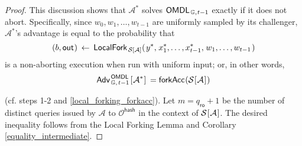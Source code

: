 \documentclass[10pt, psamsfonts, reqno]{amsart}
\theoremstyle{definition}
\theoremstyle{remark}
\numberwithin{equation}{section}
\begin{document}
\begin{proof}
This discussion shows that $\mathcal{A}^*$ solves
$\mathsf{OMDL}
	_{\hspace{1pt}\mathbb{G},\hspace{0.5pt} t-1}$
exactly if it does not abort.
Specifically, since $w_0, w_1, \dots, w_{t-1}$
are uniformly sampled by its challenger,
$\mathcal{A}^*$'s advantage is equal to the probability that
\vspace{5pt}
\begin{equation*}
    		(
				\vspace{1pt}
				b,
				\vspace{1pt}
				\mathsf{out}
				\hspace{0.5pt}
			)
			\hspace{2pt}
			\leftarrow
			\hspace{2pt}
    		\mathsf{LocalFork}_{
				\hspace{1pt}
    			\mathcal{S}
    			\hspace{0pt}[
    				\hspace{0pt}
    				\mathcal{A}
    				\hspace{0pt}
    			]
    		}
			(
   				\hspace{1pt}
				y ^*,
				\hspace{1pt}
				x_1^*, \dots, x_{t-1}^*,
				\hspace{1pt}
				w_1, \dots, w_{t-1}
				\hspace{1pt}
   			)
\vspace{5pt}
\end{equation*}
\noindent
is a non-aborting execution when run
with uniform input; or, in other words,
\vspace{5pt}
\begin{equation*}
	\mathsf{Adv}
		_{\hspace{1pt}\mathbb{G},\hspace{1pt} t-1}
		^{\hspace{1pt}\mathsf{OMDL}}
		\hspace{1pt}
		[
			\hspace{0.5pt}
			\mathcal{A}^*
			\hspace{0.5pt}
		]
	\hspace{2pt}
	=
	\mathsf{forkAcc}
		\hspace{0.5pt}
		(
			\mathcal{S}
			\hspace{0.5pt}
			[
				\hspace{0.5pt}
				\mathcal{A}
				\hspace{0.5pt}
			]
			\hspace{0.5pt}
		)
\vspace{5pt}
\end{equation*}

\noindent
(cf. steps 1-2 and \eqref{local_forking_forkacc}).
Let $m = q_{\mathsf{ro}} + 1$ be the number of distinct
queries issued by $\mathcal{A}$ to $\mathcal{O}^{\mathsf{hash}}$
in the context of
$\mathcal{S}\hspace{0.5pt}[\hspace{0.5pt}\mathcal{A}\hspace{0.5pt}]$.
The desired inequality follows from the
Local Forking Lemma
and Corollary \ref{equality_intermediate}.
\end{proof}
\end{document}
